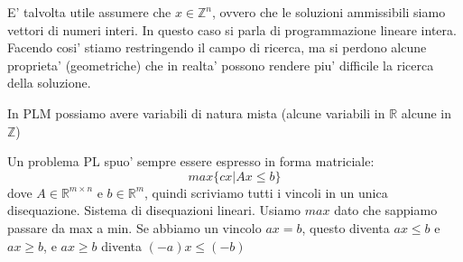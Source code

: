 \documentclass{report}
\begin{document}
E' talvolta utile assumere che $ x \in \mathbb{Z}^n $, ovvero che le soluzioni ammissibili siamo vettori di numeri interi. In questo caso si parla di programmazione lineare intera. Facendo cosi' stiamo restringendo il campo di ricerca, ma si perdono alcune proprieta' (geometriche) che in realta' possono rendere piu' difficile la ricerca della soluzione.

In PLM possiamo avere variabili di natura mista (alcune variabili in $ \mathbb{R} $ alcune in $ \mathbb{Z} $)

Un problema PL spuo' sempre essere espresso in forma matriciale:
\[
max \{cx | Ax \leq b\}
\]
dove $ A \in \mathbb{R}^{m \times n} $ e $ b \in \mathbb{R}^m $, quindi scriviamo tutti i vincoli in un unica disequazione. Sistema di disequazioni lineari. Usiamo $ max $ dato che sappiamo passare da max a min. Se abbiamo un vincolo $ ax = b $, questo diventa $ ax \leq b $ e $ ax \geq b $, e $ ax \geq b $ diventa $ (-a)x \leq (-b) $
\end{document}
